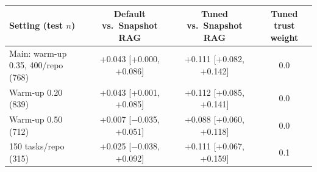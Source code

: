 \begin{tabular}{lccc}
\toprule
Setting (test $n$) & Default vs.\ Snapshot RAG & Tuned vs.\ Snapshot RAG & Tuned trust weight \\
\midrule
Main: warm-up 0.35, 400/repo (768) & +0.043 [+0.000, +0.086] & +0.111 [+0.082, +0.142] & 0.0 \\
Warm-up 0.20 (839) & +0.043 [+0.001, +0.085] & +0.112 [+0.085, +0.141] & 0.0 \\
Warm-up 0.50 (712) & +0.007 [$-$0.035, +0.051] & +0.088 [+0.060, +0.118] & 0.0 \\
150 tasks/repo (315) & +0.025 [$-$0.038, +0.092] & +0.111 [+0.067, +0.159] & 0.1 \\
\bottomrule
\end{tabular}